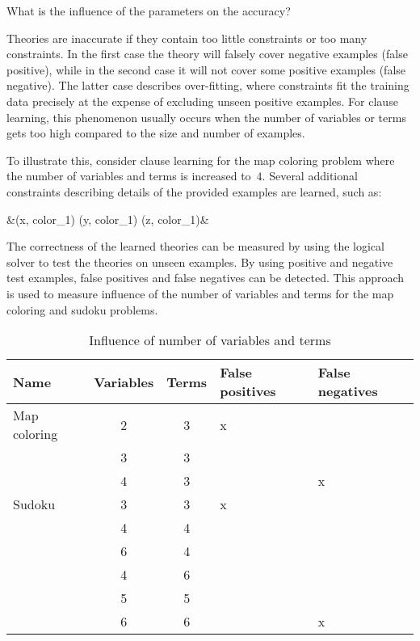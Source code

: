\begin{question}
	What is the influence of the parameters on the accuracy?
	\label{q:cd_acc_influence}
\end{question}

\begin{observation}
	Theories are inaccurate if they contain too little constraints or too many constraints.
	In the first case the theory will falsely cover negative examples (false positive), while in the second case it will not cover some positive examples (false negative).
	The latter case describes over-fitting, where constraints fit the training data precisely at the expense of excluding unseen positive examples.
	For clause learning, this phenomenon usually occurs when the number of variables or terms gets too high compared to the size and number of examples.

	To illustrate this, consider clause learning for the map coloring problem where the number of variables and terms is increased to~$4$.
	Several additional constraints describing details of the provided examples are learned, such as: 
	\begin{shiftedflalign*}
		 &\leftarrow {}(x, color_1) \land {}(y, color_1)  \land {}(z, color_1)&
	\end{shiftedflalign*}
 
\end{observation}

\begin{experiment}
	\label{exp:cd_acc_influence_par}
	The correctness of the learned theories can be measured by using the logical solver to test the theories on unseen examples.
	By using positive and negative test examples, false positives and false negatives can be detected.
	This approach is used to measure influence of the number of variables and terms for the map coloring and sudoku problems.

	\begin{table}[!htp]
		\begin{tabularx}{\textwidth}{lcc|XX}
			\textbf{Name} & \textbf{Variables} & \textbf{Terms}	& \textbf{False positives} & \textbf{False negatives} \\
			\toprule
			Map coloring & 2 & 3 & x &   \\
			& 3 & 3 &   &   \\
			& 4 & 3 &   & x \\
			\midrule
			Sudoku & 3 & 3 & x	&   \\
			& 4 & 4 &   	&   \\
			& 6 & 4 &   	&   \\
			& 4 & 6 &   	&   \\
			& 5 & 5 &   	&   \\
			& 6 & 6 &   	& x
		\end{tabularx}
		\label{tbl:cd_acc_influence}
		\caption{Influence of number of variables and terms}
	\end{table}

\end{experiment}

